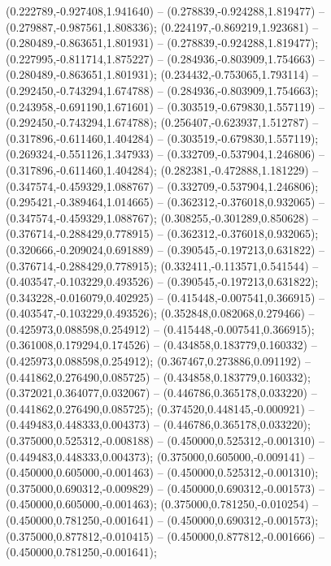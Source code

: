  (0.222789,-0.927408,1.941640) -- (0.278839,-0.924288,1.819477) -- (0.279887,-0.987561,1.808336);
 (0.224197,-0.869219,1.923681) -- (0.280489,-0.863651,1.801931) -- (0.278839,-0.924288,1.819477);
 (0.227995,-0.811714,1.875227) -- (0.284936,-0.803909,1.754663) -- (0.280489,-0.863651,1.801931);
 (0.234432,-0.753065,1.793114) -- (0.292450,-0.743294,1.674788) -- (0.284936,-0.803909,1.754663);
 (0.243958,-0.691190,1.671601) -- (0.303519,-0.679830,1.557119) -- (0.292450,-0.743294,1.674788);
 (0.256407,-0.623937,1.512787) -- (0.317896,-0.611460,1.404284) -- (0.303519,-0.679830,1.557119);
 (0.269324,-0.551126,1.347933) -- (0.332709,-0.537904,1.246806) -- (0.317896,-0.611460,1.404284);
 (0.282381,-0.472888,1.181229) -- (0.347574,-0.459329,1.088767) -- (0.332709,-0.537904,1.246806);
 (0.295421,-0.389464,1.014665) -- (0.362312,-0.376018,0.932065) -- (0.347574,-0.459329,1.088767);
 (0.308255,-0.301289,0.850628) -- (0.376714,-0.288429,0.778915) -- (0.362312,-0.376018,0.932065);
 (0.320666,-0.209024,0.691889) -- (0.390545,-0.197213,0.631822) -- (0.376714,-0.288429,0.778915);
 (0.332411,-0.113571,0.541544) -- (0.403547,-0.103229,0.493526) -- (0.390545,-0.197213,0.631822);
 (0.343228,-0.016079,0.402925) -- (0.415448,-0.007541,0.366915) -- (0.403547,-0.103229,0.493526);
 (0.352848,0.082068,0.279466) -- (0.425973,0.088598,0.254912) -- (0.415448,-0.007541,0.366915);
 (0.361008,0.179294,0.174526) -- (0.434858,0.183779,0.160332) -- (0.425973,0.088598,0.254912);
 (0.367467,0.273886,0.091192) -- (0.441862,0.276490,0.085725) -- (0.434858,0.183779,0.160332);
 (0.372021,0.364077,0.032067) -- (0.446786,0.365178,0.033220) -- (0.441862,0.276490,0.085725);
 (0.374520,0.448145,-0.000921) -- (0.449483,0.448333,0.004373) -- (0.446786,0.365178,0.033220);
 (0.375000,0.525312,-0.008188) -- (0.450000,0.525312,-0.001310) -- (0.449483,0.448333,0.004373);
 (0.375000,0.605000,-0.009141) -- (0.450000,0.605000,-0.001463) -- (0.450000,0.525312,-0.001310);
 (0.375000,0.690312,-0.009829) -- (0.450000,0.690312,-0.001573) -- (0.450000,0.605000,-0.001463);
 (0.375000,0.781250,-0.010254) -- (0.450000,0.781250,-0.001641) -- (0.450000,0.690312,-0.001573);
 (0.375000,0.877812,-0.010415) -- (0.450000,0.877812,-0.001666) -- (0.450000,0.781250,-0.001641);
